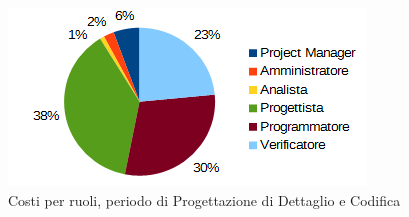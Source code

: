 	\begin{figure}[H]
		\centering
		\includegraphics[width=1\linewidth]{immagini/grafici/progettazione_dettaglio_codifica-torta-costo.png}
		\caption{Costi per ruoli, periodo di Progettazione di Dettaglio e Codifica}
	\end{figure}
